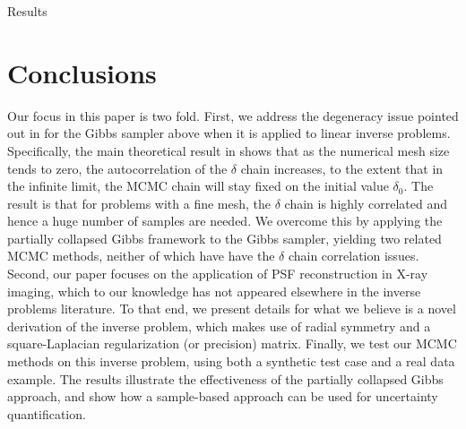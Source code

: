 \begin{chapter}{Results}
\section{Conclusions}
\label{sec:Conclusions}

Our focus in this paper is two fold. First, we address the degeneracy issue pointed out in \cite{AgaBarPapStu} for the Gibbs sampler above when it is applied to linear inverse problems. Specifically, the main theoretical result in \cite{AgaBarPapStu} shows that as the numerical mesh size tends to zero, the autocorrelation of the $\delta$ chain increases, to the extent that in the infinite limit, the MCMC chain will stay fixed on the initial value $\delta_0$. The result is that for problems with a fine mesh, the $\delta$ chain is highly correlated and hence a huge number of samples are needed. We overcome this by applying the partially collapsed Gibbs framework to the Gibbs sampler, yielding two related MCMC methods, neither of which have have the $\delta$ chain correlation issues. Second, our paper focuses on the application of PSF reconstruction in X-ray imaging, which to our knowledge has not appeared elsewhere in the inverse problems literature. To that end, we present details for what we believe is a novel derivation of the inverse problem, which makes use of radial symmetry and a square-Laplacian regularization (or precision) matrix. Finally, we test our MCMC methods on this inverse problem, using both a synthetic test case and a real data example. The results illustrate the effectiveness of the partially collapsed Gibbs approach, and show how a sample-based approach can be used for uncertainty quantification.

\end{chapter}

